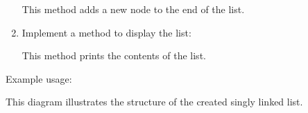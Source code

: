 \begin{enumerate}
  This method adds a new node to the end of the list.
\item
  Implement a method to display the list:

\begin{Shaded}
\begin{Highlighting}[]
\NormalTok{):}
\OperatorTok{=} 
        \OperatorTok{=}\NormalTok{)}
\OperatorTok{=}
    \NormalTok{(}\NormalTok{)}
\end{Highlighting}
\end{Shaded}

  This method prints the contents of the list.
\end{enumerate}

Example usage:

\begin{Shaded}
\begin{Highlighting}[]
\OperatorTok{=}

\NormalTok{)}
\NormalTok{)}
\NormalTok{)}

\end{Highlighting}
\end{Shaded}

\begin{Shaded}
\begin{Highlighting}[]
\end{Highlighting}
\end{Shaded}

This diagram illustrates the structure of the created singly linked
list.

